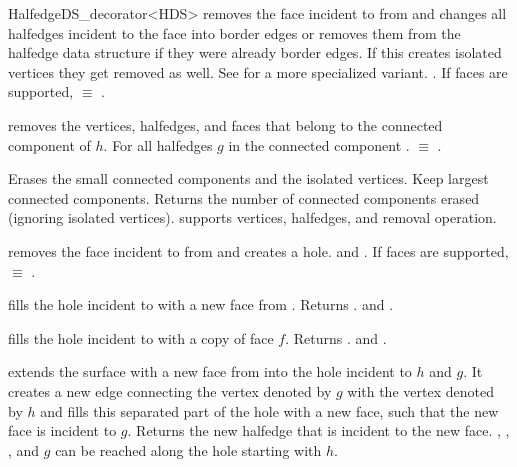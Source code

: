 \begin{ccRefClass}{HalfedgeDS_decorator<HDS>}
 {removes the
   face incident to  from  and changes all halfedges
   incident to the face into border edges or removes them from the
   halfedge data structure if they were already border edges. If this
   creates isolated vertices they get removed as well. See
    for a more specialized variant.
   \ccPrecond {}.
    If faces are supported,
    $\equiv$ .}

    {removes the  vertices, halfedges, and faces that belong to the
     connected component of $h$. \ccPrecond For all halfedges $g$ in the
     connected component .
        $\equiv$
     .}

    {Erases the small connected components and the isolated vertices.
     Keep  largest connected components.
     Returns the number of connected components erased (ignoring isolated vertices).
      supports vertices, halfedges, and removal operation.}



   {removes the face incident to  from  and creates a hole.
    \ccPrecond {} and .
     If faces are supported,
     $\equiv$ .}

   {fills the hole incident to  with a new face from .
    Returns .
    \ccPrecond {} and .}

   {fills the hole incident to  with a copy of face $f$.
    Returns .
    \ccPrecond {} and .}

   {extends the surface with a new face from  into the hole
    incident to $h$ and $g$. It creates a new edge connecting the vertex
    denoted by $g$ with the vertex denoted by $h$ and fills this separated
    part of the hole with a new face, such that the new face is incident
    to $g$. Returns the new halfedge that is incident to the new face.
    \ccPrecond {}, ,
    ,  and $g$ can be reached
    along the hole starting with $h$.}


\end{ccRefClass}
